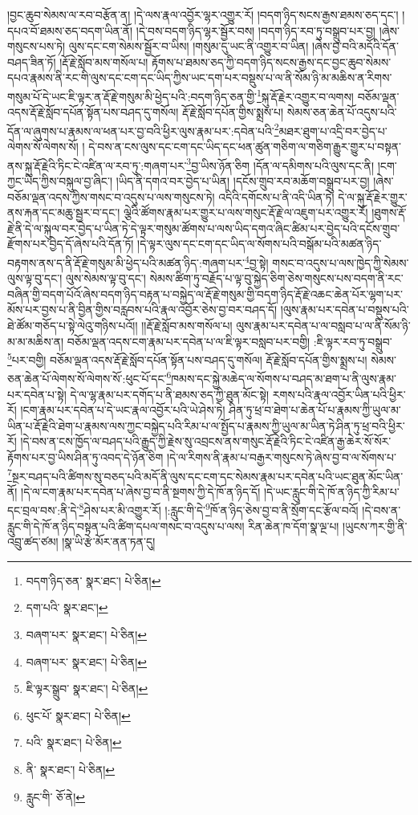 །བྱང་ཆུབ་སེམས་ལ་རབ་བརྩོན་ན། །དེ་ལས་རྣལ་འབྱོར་ལྷར་འགྱུར་རོ། །བདག་ཉིད་སངས་རྒྱས་ཐམས་ཅད་དང་། །དཔའ་བོ་ཐམས་ཅད་བདག་ཡིན་ནོ། །དེ་བས་བདག་ཉིད་ལྷར་སྦྱོར་བས། །བདག་ཉིད་རབ་ཏུ་བསྒྲུབ་པར་བྱ། །ཞེས་གསུངས་པས་ཏེ། ལུས་དང་ངག་སེམས་སྦྱོར་བ་ཡིས། །གསུམ་དུ་ཡང་ནི་འགྱུར་བ་ཡིན། །ཞེས་བྱ་བའི་མདོའི་དོན་བཤད་ཟིན་ཏོ། །རྡོ་རྗེ་སློབ་མས་གསོལ་པ། རྟོགས་པ་ཐམས་ཅད་ཀྱི་བདག་ཉིད་སངས་རྒྱས་དང་བྱང་ཆུབ་སེམས་དཔའ་རྣམས་ནི་རང་གི་ལུས་དང་ངག་དང་ཡིད་ཀྱིས་ཡང་དག་པར་བསྡུས་པ་ལ་ནི་སོམ་ཉི་མ་མཆིས་ན་རིགས་གསུམ་པོ་དེ་ཡང་ཇི་ལྟར་ན་རྡོ་རྗེ་གསུམ་མི་ཕྱེད་པའི་:བདག་ཉིད་ཅན་གྱི་\footnote{བདག་ཉིད་ཅན་  སྣར་ཐང་།  པེ་ཅིན། }སྐུ་རྡོ་རྗེར་འགྱུར་བ་ལགས། བཅོམ་ལྡན་འདས་རྡོ་རྗེ་སློབ་དཔོན་སྟོན་པས་བཤད་དུ་གསོལ། རྡོ་རྗེ་སློབ་དཔོན་གྱིས་སྨྲས་པ། སེམས་ཅན་ཆེན་པོ་འདུས་པའི་དོན་ལ་ཞུགས་པ་རྣམས་ལ་ཕན་པར་བྱ་བའི་ཕྱིར་ལུས་རྣམ་པར་:དབེན་པའི་\footnote{དག་པའི་  སྣར་ཐང་། }མཐར་ཐུག་པ་འདྲི་བར་བྱེད་པ་ལེགས་སོ་ལེགས་སོ། །
དེ་བས་ན་ངས་ལུས་དང་ངག་དང་ཡིད་དང་ཕན་ཚུན་གཅིག་ལ་གཅིག་རྒྱུར་གྱུར་པ་བསྟན་ནས་སྐུ་རྡོ་རྗེའི་ཏིང་ངེ་འཛིན་ལ་རབ་ཏུ་:གཞག་པར་\footnote{བཞག་པར་  སྣར་ཐང་།  པེ་ཅིན། }བྱ་ཡིས་ཉོན་ཅིག །དོན་ལ་དམིགས་པའི་ལུས་དང་ནི། །ངག་ཀྱང་ཡིད་ཀྱིས་བསྐུལ་བྱ་ཞིང་། །ཡིད་ནི་དགའ་བར་བྱེད་པ་ཡིན། །དངོས་གྲུབ་རབ་མཆོག་བསྒྲུབ་པར་བྱ། །ཞེས་བཅོམ་ལྡན་འདས་ཀྱིས་གསང་བ་འདུས་པ་ལས་གསུངས་ཏེ། འདིའི་དགོངས་པ་ནི་འདི་ཡིན་ཏེ། དེ་ལ་སྐུ་རྡོ་རྗེར་གྱུར་ནས་རྐན་དང་མཆུ་སྦྱར་བ་དང་། ལྕེའི་ཚོགས་རྣམ་པར་གྱུར་པ་ལས་གསུང་རྡོ་རྗེ་ལ་འཇུག་པར་འགྱུར་རོ། །ཐུགས་རྡོ་རྗེ་ནི་དེ་ལ་སྐུལ་བར་བྱེད་པ་ཡིན་ཏེ་དེ་ལྟར་གསུམ་ཚོགས་པ་ལས་ཡིད་དགའ་ཞིང་ཚིམ་པར་བྱེད་པའི་དངོས་གྲུབ་རྫོགས་པར་བྱེད་དོ་ཞེས་པའི་དོན་ཏོ། །དེ་ལྟར་ལུས་དང་ངག་དང་ཡིད་ལ་སོགས་པའི་བསྒོམ་པའི་མཚན་ཉིད་བརྟགས་ནས་ད་ནི་རྡོ་རྗེ་གསུམ་མི་ཕྱེད་པའི་མཚན་ཉིད་:གཞག་པར་\footnote{བཞག་པར་  སྣར་ཐང་།  པེ་ཅིན། }བྱ་སྟེ། གསང་བ་འདུས་པ་ལས་ཁྱེད་ཀྱི་སེམས་ལུས་ལྟ་བུ་དང་། ལུས་སེམས་ལྟ་བུ་དང་། སེམས་ཚིག་ཏུ་བརྗོད་པ་ལྟ་བུ་སྐྱེད་ཅིག་ཅེས་གསུངས་པས་བདག་ནི་རང་བཞིན་གྱི་བདག་པོའོ་ཞེས་བདག་ཉིད་བརྟན་པ་བསྐྱེད་ལ་རྡོ་རྗེ་གསུམ་གྱི་བདག་ཉིད་རྡོ་རྗེ་འཆང་ཆེན་པོར་ལྷག་པར་མོས་པར་བྱས་པ་ནི་བྱིན་གྱིས་བརླབས་པའི་རྣལ་འབྱོར་ཅེས་བྱ་བར་བཤད་དོ། །ལུས་རྣམ་པར་དབེན་པ་བསྡུས་པའི་ཐེ་ཚོམ་གཅོད་པ་སྟེ་ལེའུ་གཉིས་པའོ།། །།རྡོ་རྗེ་སློབ་མས་གསོལ་པ། ལུས་རྣམ་པར་དབེན་པ་ལ་བསླབ་པ་ལ་ནི་སོམ་ཉི་མ་མ་མཆིས་ན། བཅོམ་ལྡན་འདས་ངག་རྣམ་པར་དབེན་པ་ལ་ཇི་ལྟར་བསླབ་པར་བགྱི། :ཇི་ལྟར་རབ་ཏུ་བསྒྲུབ་\footnote{ཇི་ལྟར་སྒྲུབ་  སྣར་ཐང་།  པེ་ཅིན། }པར་བགྱི། བཅོམ་ལྡན་འདས་རྡོ་རྗེ་སློབ་དཔོན་སྟོན་པས་བཤད་དུ་གསོལ། རྡོ་རྗེ་སློབ་དཔོན་གྱིས་སྨྲས་པ། སེམས་ཅན་ཆེན་པོ་ལེགས་སོ་ལེགས་སོ་:ཕུང་པོ་དང་\footnote{ཕུང་པོ་  སྣར་ཐང་།  པེ་ཅིན། }ཁམས་དང་སྐྱེ་མཆེད་ལ་སོགས་པ་བཤད་མ་ཐག་པ་ནི་ལུས་རྣམ་པར་དབེན་པ་སྟེ། དེ་ལ་ལྷ་རྣམ་པར་དགོད་པ་ནི་ཐམས་ཅད་ཀྱི་ཐུན་མོང་སྟེ། རགས་པའི་རྣལ་འབྱོར་ཡིན་པའི་ཕྱིར་རོ། །ངག་རྣམ་པར་དབེན་པ་དེ་ཡང་རྣལ་འབྱོར་པའི་ཡེ་ཤེས་ཏེ། ཤིན་ཏུ་ཕྲ་བ་ཐེག་པ་ཆེན་པོ་པ་རྣམས་ཀྱི་ཡུལ་མ་ཡིན་པ་རྡོ་རྗེའི་ཐེག་པ་རྣམས་ལས་ཀྱང་བསྐྱེད་པའི་རིམ་པ་ལ་སྤྱོད་པ་རྣམས་ཀྱི་ཡུལ་མ་ཡིན་ཏེ་ཤིན་ཏུ་ཕྲ་བའི་ཕྱིར་རོ། །དེ་བས་ན་ངས་ཁྱོད་ལ་བཤད་པའི་རྒྱུད་ཀྱི་རྗེས་སུ་འབྲངས་ནས་གསུང་རྡོ་རྗེའི་ཏིང་ངེ་འཛིན་རྒྱ་ཆེར་སོ་སོར་རྟོགས་པར་བྱ་ཡིས་ཤིན་ཏུ་འབད་དེ་ཉོན་ཅིག །དེ་ལ་རིགས་ནི་རྣམ་པ་བརྒྱར་གསུངས་ཏེ་ཞེས་བྱ་བ་ལ་སོགས་པ་\footnote{པའི་  སྣར་ཐང་།  པེ་ཅིན། }སྔར་བཤད་པའི་ཚིགས་སུ་བཅད་པའི་མདོ་ནི་ལུས་དང་ངག་དང་སེམས་རྣམ་པར་དབེན་པའི་ཡང་ཐུན་མོང་ཡིན་ནོ། །དེ་ལ་ངག་རྣམ་པར་དབེན་པ་ཞེས་བྱ་བ་ནི་སྔགས་ཀྱི་དེ་ཁོ་ན་ཉིད་དོ། །དེ་ཡང་རླུང་གི་དེ་ཁོ་ན་ཉིད་ཀྱི་རིམ་པ་དང་བྲལ་བས་:ནི་དེ་\footnote{ནི་  སྣར་ཐང་།  པེ་ཅིན། }ཤེས་པར་མི་འགྱུར་རོ། །:རླུང་གི་དེ་\footnote{རླུང་གི་  ཅོ་ནེ། }ཁོ་ན་ཉིད་ཅེས་བྱ་བ་ནི་སྲོག་དང་རྩོལ་བའོ། །དེ་བས་ན་རླུང་གི་དེ་ཁོ་ན་ཉིད་བསྟན་པའི་ཚིག་དཔལ་གསང་བ་འདུས་པ་ལས། རིན་ཆེན་ཁ་དོག་སྣ་ལྔ་པ། །ཡུངས་ཀར་གྱི་ནི་འབྲུ་ཚད་ཙམ། །སྣ་ཡི་རྩེ་མོར་ནན་ཏན་དུ། 